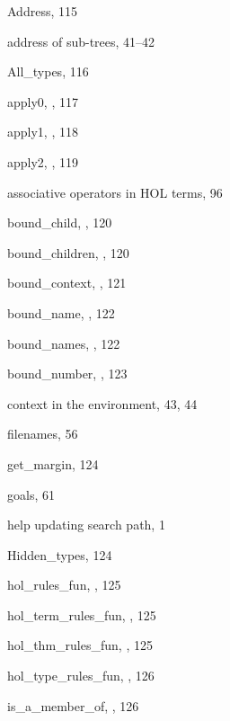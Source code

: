 \begin{theindex}

  \item {\ptt Address}, 115
  \item address
    \subitem of sub-trees, 41--42
  \item {\ptt All\_types}, 116
  \item {\ptt apply0}, , 117
  \item {\ptt apply1}, , 118
  \item {\ptt apply2}, , 119
  \item associative operators in HOL terms, 96

  \indexspace

  \item {\ptt bound\_child}, , 120
  \item {\ptt bound\_children}, , 120
  \item {\ptt bound\_context}, , 121
  \item {\ptt bound\_name}, , 122
  \item {\ptt bound\_names}, , 122
  \item {\ptt bound\_number}, , 123

  \indexspace

  \item context in the environment, 43, 44

  \indexspace

  \item filenames, 56

  \indexspace

  \item {\ptt get\_margin}, 124
  \item goals, 61

  \indexspace

  \item help
    \subitem updating search path, 1
  \item {\ptt Hidden\_types}, 124
  \item {\ptt hol\_rules\_fun}, , 125
  \item {\ptt hol\_term\_rules\_fun}, , 125
  \item {\ptt hol\_thm\_rules\_fun}, , 125
  \item {\ptt hol\_type\_rules\_fun}, , 126

  \indexspace

  \item {\ptt is\_a\_member\_of}, , 126


\end{theindex}
